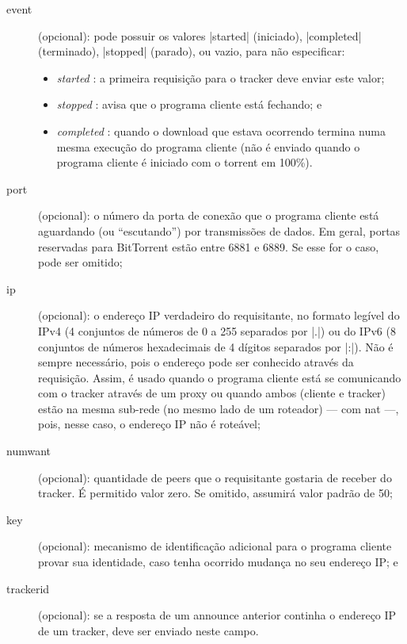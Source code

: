 \begin{description}
    \item[event] (opcional): pode possuir os valores \sverb|started| (iniciado),
        \sverb|completed| (terminado), \sverb|stopped| (parado), ou vazio, para não
        especificar:

        \begin{itemize}
            \item \emph{started} : a primeira requisição para o \gls*{tracker} deve
                enviar este valor;
            \item \emph{stopped} : avisa que o programa cliente está fechando; e
            \item \emph{completed} : quando o download que estava ocorrendo termina numa
                mesma execução do programa cliente (não é enviado quando o programa
                cliente é iniciado com o \gls*{torrent} em 100\%).
        \end{itemize}

    \item[port] (opcional): o número da porta de conexão que o programa cliente está
        aguardando (ou ``escutando'') por transmissões de dados. Em geral, portas
        reservadas para BitTorrent estão entre 6881 e 6889. Se esse for o caso, pode
        ser omitido;

    \item[ip] (opcional): o endereço IP verdadeiro do requisitante, no formato legível
        do IPv4 (4 conjuntos de números de 0 a 255 separados por \bverb|.|) ou do IPv6
        (8 conjuntos de números hexadecimais de 4 dígitos separados por \bverb|:|). Não
        é sempre necessário, pois o endereço pode ser conhecido através da requisição.
        Assim, é usado quando o programa cliente está se comunicando com o
        \gls*{tracker} através de um \gls{proxy} ou quando ambos (cliente e
        \gls*{tracker}) estão na mesma sub-rede (no mesmo lado de um roteador) ---
        com \gls{nat} ---, pois, nesse caso, o endereço IP não é roteável;

    \item[numwant] (opcional): quantidade de \glspl*{peer} que o requisitante gostaria
        de receber do \gls*{tracker}. É permitido valor zero. Se omitido, assumirá
        valor padrão de 50;

    \item[key] (opcional): mecanismo de identificação adicional para o programa cliente
        provar sua identidade, caso tenha ocorrido mudança no seu endereço IP; e

    \item[trackerid] (opcional): se a resposta de um \gls*{announce} anterior continha
        o endereço IP de um \gls*{tracker}, deve ser enviado neste campo.
\end{description}

